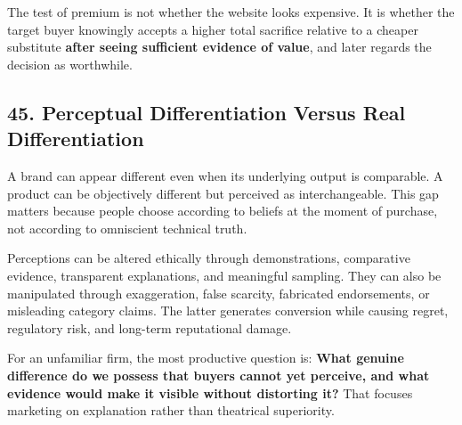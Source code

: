 The test of premium is not whether the website looks expensive. It is whether the target buyer knowingly accepts a higher total sacrifice relative to a cheaper substitute \textbf{after seeing sufficient evidence of value}, and later regards the decision as worthwhile.

\subsection*{45. Perceptual Differentiation Versus Real Differentiation}

A brand can appear different even when its underlying output is comparable. A product can be objectively different but perceived as interchangeable. This gap matters because people choose according to beliefs at the moment of purchase, not according to omniscient technical truth.

Perceptions can be altered ethically through demonstrations, comparative evidence, transparent explanations, and meaningful sampling. They can also be manipulated through exaggeration, false scarcity, fabricated endorsements, or misleading category claims. The latter generates conversion while causing regret, regulatory risk, and long-term reputational damage.

For an unfamiliar firm, the most productive question is: \textbf{What genuine difference do we possess that buyers cannot yet perceive, and what evidence would make it visible without distorting it?} That focuses marketing on explanation rather than theatrical superiority.
